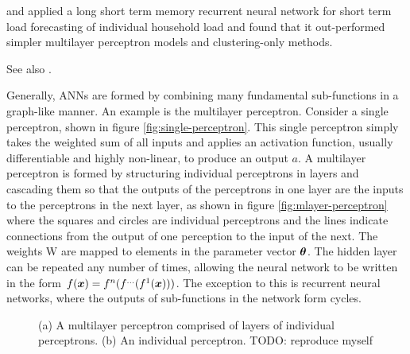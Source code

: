 \citet{Kong2017} and \citet{Kong2018} applied a long short term memory recurrent neural network for short term load forecasting of individual household load and found that it out-performed simpler multilayer perceptron models and clustering-only methods.
\par
See also \citep{Mansouri2014}.
\par
Generally, ANNs are formed by combining many fundamental sub-functions in a graph-like manner. 
An example is the multilayer perceptron.
Consider a single perceptron, shown in figure \ref{fig:single-perceptron}.
This single perceptron simply takes the weighted sum of all inputs and applies an activation function, usually differentiable and highly non-linear, to produce an output $a$.
A multilayer perceptron is formed by structuring individual perceptrons in layers and cascading them so that the outputs of the perceptrons in one layer are the inputs to the perceptrons in the next layer, as shown in figure \ref{fig:mlayer-perceptron} where the squares and circles are individual perceptrons and the lines indicate connections from the output of one perception to the input of the next.
The weights W are mapped to elements in the parameter vector ${\bm{\theta}}$.
The hidden layer can be repeated any number of times, allowing the neural network to be written in the form $f({\bm{x}}) = f^n(f^{\ldots}(f^1({\bm{x}})))$.
The exception to this is recurrent neural networks, where the outputs of sub-functions in the network form cycles.
\begin{figure}[htbp]
	\centering
	\quad\quad
	\caption{(a) A multilayer perceptron comprised of layers of individual perceptrons. (b) An individual perceptron. TODO: reproduce myself}
	\label{fig:simple-ann}
\end{figure}

